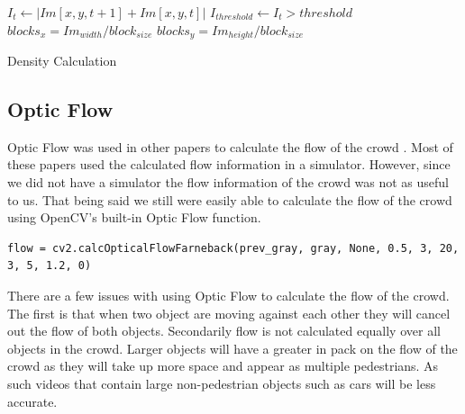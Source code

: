 \documentclass[12pt, onecolumn, conference]{IEEEtran}
\begin{document}
\begin{algorithm}
\DontPrintSemicolon
 $I_{t} \leftarrow | Im[x, y, t+1] + Im[x, y, t] | $\;
 $I_{threshold} \leftarrow I_{t} > threshold$\;
 $blocks_{x} = Im_{width}/block_{size}$\;
 $blocks_{y} = Im_{height}/block_{size}$\;
\caption{Density Calculation}
\end{algorithm}

\subsection{Optic Flow}

Optic Flow was used in other papers to calculate the flow of the crowd \cite{N. Courty}\cite{B. Boghossian}\cite{R. Mehran}. Most of these papers used the calculated flow information in a simulator. However, since we did not have a simulator the flow information of the crowd was not as useful to us. That being said we still were easily able to calculate the flow of the crowd using OpenCV’s built-in Optic Flow function.

\begin{lstlisting}
flow = cv2.calcOpticalFlowFarneback(prev_gray, gray, None, 0.5, 3, 20, 3, 5, 1.2, 0)
\end{lstlisting}

There are a few issues with using Optic Flow to calculate the flow of the crowd. The first is that when two object are moving against each other they will cancel out the flow of both objects. Secondarily flow is not calculated equally over all objects in the crowd. Larger objects will have a greater in pack on the flow of the crowd as they will take up more space and appear as multiple pedestrians. As such videos that contain large non-pedestrian objects such as cars will be less accurate.
\end{document}
